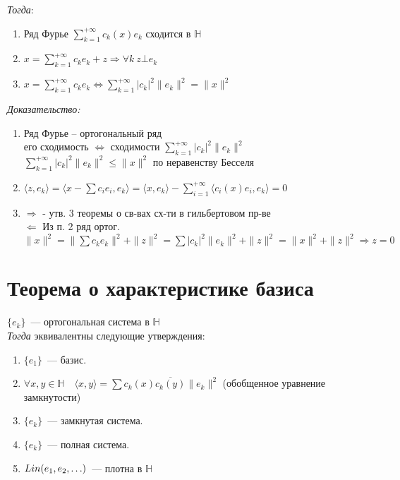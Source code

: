 \documentclass[paper=a4, fontsize=14pt]{report}
\begin{document}
\emph{Тогда}:
\begin{enumerate}
	\item Ряд Фурье $\sum\limits_{k=1}^{+\infty} c_k(x) e_k$ сходится в $\mathds{H}$
	\item $x =\sum\limits_{k=1}^{+\infty} c_k e_k + z \Rightarrow \forall k \ z \bot e_k$
	\item $x =\sum\limits_{k=1}^{+\infty} c_k e_k \Leftrightarrow \sum\limits_{k=1}^{+\infty} \vert c_k \vert^2 \|e_k\|^2=\|x\|^2$
\end{enumerate}

\emph{Доказательство:}
\begin{enumerate}
	\item
	Ряд Фурье -- ортогональный ряд\\
	его сходимость $\Leftrightarrow$ сходимости $\sum\limits_{k=1}^{+\infty} \vert c_k \vert^2 \|e_k\|^2$\\
	$\sum\limits_{k=1}^{+\infty} \vert c_k \vert^2 \|e_k\|^2 \le \|x\|^2$ по неравенству Бесселя
	\item
	$\langle z, e_k \rangle = \langle x - \sum c_i e_i, e_k \rangle = \langle x, e_k \rangle - \sum\limits_{i = 1}^{+\infty}  \langle c_i(x) e_i ,e_k \rangle = 0$
	\item
	$\Rightarrow$ - утв. 3 теоремы о св-вах сх-ти в гильбертовом пр-ве\\
	$\Leftarrow$
		Из п. 2 ряд ортог.\\
		$\|x\|^2=\|\sum c_k e_k\|^2 + \|z\|^2 = \sum \vert c_k \vert^2 \|e_k\|^2 + \|z\|^2 = \|x\|^2 + \|z\|^2 \Rightarrow z = 0$
\end{enumerate}

\iffalse
$\mathbf{TODO}$ Замечания. Не уверен, нужны ли они
\fi

    \section{Теорема о характеристике базиса}

    $\{e_k\}$~--- ортогональная система в $\mathds{H}$\\

    \emph{Тогда} эквивалентны следующие утверждения:
    \begin{enumerate}
        \item $\{e_1\}$~--- базис.
        \item $\forall x, y \in \mathds{H} \quad \langle x, y \rangle = \sum c_k(x)\overline{c_k(y)}\|e_k\|^2$ (обобщенное уравнение замкнутости)
        \item $\{e_k\}$~--- замкнутая система.
        \item $\{e_k\}$~--- полная система.
        \item $Lin(e_1, e_2, \mathellipsis)$~--- плотна в $\mathds{H}$
    \end{enumerate}
    
\end{document}
